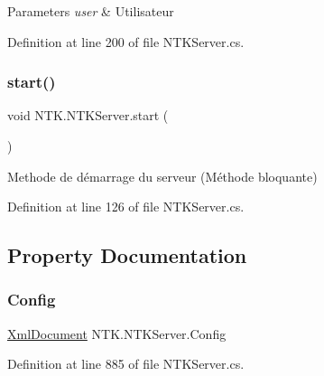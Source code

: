 \begin{DoxyParams}{Parameters}
{\em user} & Utilisateur\\
\hline
\end{DoxyParams}


Definition at line 200 of file N\+T\+K\+Server.\+cs.

\mbox{\label{class_n_t_k_1_1_n_t_k_server_a7590bf94a2e539571a154f16d65d6ea5}} 
\subsubsection{\texorpdfstring{start()}{start()}}
{\footnotesize\ttfamily void N\+T\+K.\+N\+T\+K\+Server.\+start (\begin{DoxyParamCaption}{ }\end{DoxyParamCaption})}



Methode de démarrage du serveur (Méthode bloquante) 



Definition at line 126 of file N\+T\+K\+Server.\+cs.



\subsection{Property Documentation}
\mbox{\label{class_n_t_k_1_1_n_t_k_server_aeffb548abcde3baa2c4c8e8e86840359}} 
\subsubsection{\texorpdfstring{Config}{Config}}
{\footnotesize\ttfamily \mbox{\hyperlink{class_n_t_k_1_1_i_o_1_1_xml_1_1_xml_document}{Xml\+Document}} N\+T\+K.\+N\+T\+K\+Server.\+Config\hspace{0.3cm}{\ttfamily [get]}}







Definition at line 885 of file N\+T\+K\+Server.\+cs.

\mbox{\label{class_n_t_k_1_1_n_t_k_server_adf9893981505868234cf63cf656c0a22}} 
